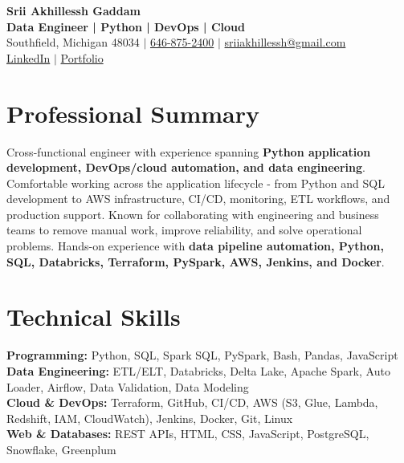 \documentclass[letterpaper,10pt]{article}
\begin{document}
\fontsize{9.35pt}{10.45pt}\selectfont

\begin{center}
    {\LARGE \textbf{Srii Akhillessh Gaddam}} \\[-1pt]
    \textbf{Data Engineer | Python | DevOps | Cloud} \\[2pt]
    Southfield, Michigan 48034 $|$
    \href{tel:6468752400}{646-875-2400} $|$
    \href{mailto:sriiakhillessh@gmail.com}{sriiakhillessh@gmail.com} \\[1pt]
    \href{https://www.linkedin.com/in/srii-akhiilessh-gaddam-b48668191/}{LinkedIn} $|$
    \href{https://sriiakhillesshg.github.io/portfolio/}{Portfolio}
\end{center}
\vspace{-8pt}

\section{Professional Summary}
\small{Cross-functional engineer with experience spanning \textbf{Python application development, DevOps/cloud automation, and data engineering}. Comfortable working across the application lifecycle - from Python and SQL development to AWS infrastructure, CI/CD, monitoring, ETL workflows, and production support. Known for collaborating with engineering and business teams to remove manual work, improve reliability, and solve operational problems. Hands-on experience with \textbf{data pipeline automation, Python, SQL, Databricks, Terraform, PySpark, AWS, Jenkins, and Docker}.}

\section{Technical Skills}
\small{
\textbf{Programming:} Python, SQL, Spark SQL, PySpark, Bash, Pandas, JavaScript \\
\textbf{Data Engineering:} ETL/ELT, Databricks, Delta Lake, Apache Spark, Auto Loader, Airflow, Data Validation, Data Modeling \\
\textbf{Cloud \& DevOps:} Terraform, GitHub, CI/CD, AWS (S3, Glue, Lambda, Redshift, IAM, CloudWatch), Jenkins, Docker, Git, Linux \\
\textbf{Web \& Databases:} REST APIs, HTML, CSS, JavaScript, PostgreSQL, Snowflake, Greenplum
}

\end{document}
